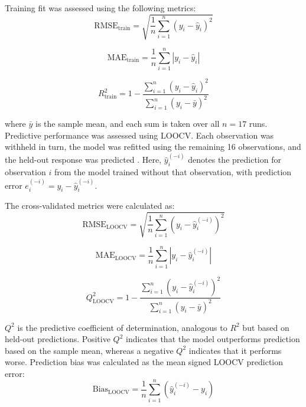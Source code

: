 \documentclass[MScDSA]{uccthesis}
\begin{document}
Training fit was assessed using the following metrics:
\begin{equation}
    \mathrm{RMSE}_{\mathrm{train}} = \sqrt{\frac{1}{n} \sum_{i=1}^{n}
    \left(y_i - \hat{y}_i\right)^2
    }
    \label{eq:train_rmse}
\end{equation}

\begin{equation}
    \mathrm{MAE}_{\mathrm{train}} = \frac{1}{n} \sum_{i=1}^{n}
    \left|y_i - \hat{y}_i\right|
    \label{eq:train_mae}
\end{equation}

\begin{equation}
    R^2_{\mathrm{train}} = 1 - \frac{\sum_{i=1}^{n}\left(y_i-\hat{y}_i\right)^2
    }{
    \sum_{i=1}^{n}\left(y_i-\bar{y}\right)^2
    }
    \label{eq:train_r2}
\end{equation}

where $\bar{y}$ is the sample mean, and each sum is taken over all $n=17$ runs.  Predictive performance was assessed using LOOCV. Each observation was withheld in turn, the model was refitted using the remaining 16 observations, and the held-out response was predicted \parencite{Stone:1974}. Here, $\hat{y}_{i}^{(-i)}$ denotes the prediction for observation $i$ from the model trained without that observation, with prediction error $e_{i}^{(-i)} = y_i - \hat{y}_{i}^{(-i)}$.

The cross-validated metrics were calculated as:
\begin{equation}
    \mathrm{RMSE}_{\mathrm{LOOCV}} = \sqrt{\frac{1}{n} \sum_{i=1}^{n}
    \left(y_i - \hat{y}_{i}^{(-i)}\right)^2
    }
    \label{eq:loocv_rmse}
\end{equation}

\begin{equation}
    \mathrm{MAE}_{\mathrm{LOOCV}} = \frac{1}{n} \sum_{i=1}^{n}
    \left|y_i - \hat{y}_{i}^{(-i)}\right|
    \label{eq:loocv_mae}
\end{equation}

\begin{equation}
    Q^2_{\mathrm{LOOCV}} = 1 - \frac{\sum_{i=1}^{n}\left(y_i-\hat{y}_{i}^{(-i)}\right)^2
    }{
    \sum_{i=1}^{n}\left(y_i-\bar{y}\right)^2
    }
    \label{eq:loocv_q2}
\end{equation}

$Q^2$ is the predictive coefficient of determination, analogous to $R^2$ but based on held-out predictions. Positive $Q^2$ indicates that the model outperforms prediction based on the sample mean, whereas a negative $Q^2$ indicates that it performs worse. 
Prediction bias was calculated as the mean signed LOOCV prediction error:
\begin{equation}
    \mathrm{Bias}_{\mathrm{LOOCV}} = \frac{1}{n} \sum_{i=1}^{n}
    \left(\hat{y}_{i}^{(-i)} - y_i\right)
    \label{eq:loocv_bias}
\end{equation}
\end{document}

